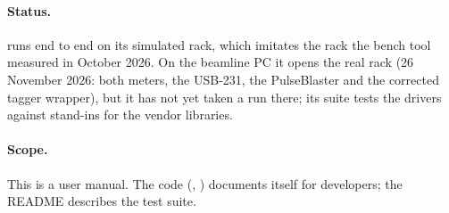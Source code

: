 \paragraph{Status.}
\oracle{} runs end to end on its simulated rack, which imitates the rack the bench tool
measured in October 2026. On the beamline PC it opens the real rack (26 November 2026: both
meters, the USB-231, the PulseBlaster and the corrected tagger wrapper), but it has not yet
taken a run there; its suite tests the drivers against stand-ins for the vendor libraries.

\paragraph{Scope.}
This is a user manual. The code (, ) documents itself
for developers; the README describes the test suite.
